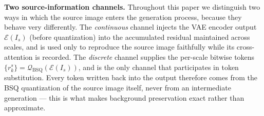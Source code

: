 \noindent\textbf{Two source-information channels.}
Throughout this paper we distinguish two ways in which the source image enters the
generation process, because they behave very differently. The \textit{continuous}
channel injects the VAE encoder output $\mathcal{E}(I_s)$ (before quantization)
into the accumulated residual maintained across scales, and is used only to
reproduce the source image faithfully while its cross-attention is recorded. The
\textit{discrete} channel supplies the per-scale bitwise tokens
$\{r_k^s\} = \mathcal{Q}_{\mathrm{BSQ}}(\mathcal{E}(I_s))$, and is the only channel
that participates in token substitution. Every token written back into the output
therefore comes from the BSQ quantization of the source image itself, never from an
intermediate generation --- this is what makes background preservation exact rather
than approximate.
